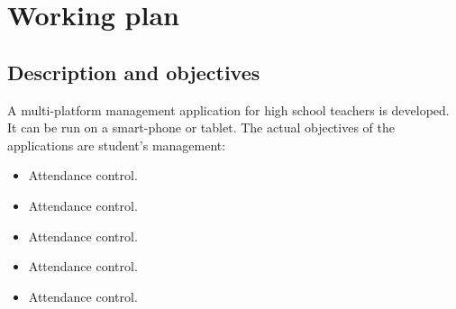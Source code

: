 \chapter{Working plan}
\section{Description and objectives}

	A multi-platform management application for high school teachers is developed. It can be run on a smart-phone or tablet. 
	The actual objectives of the applications are student's management:
	\begin{itemize}
	  \item Attendance control.
	  \item Attendance control.
	  \item Attendance control.
	  \item Attendance control.
	  \item Attendance control.
	\end{itemize}


